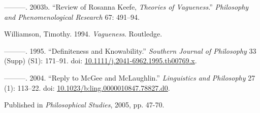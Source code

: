 \documentclass[
  10pt,
  letterpaper,
  DIV=11,
  numbers=noendperiod,
  twoside]{scrartcl}
\newlength{\cslhangindent}
\newenvironment{CSLReferences}[2] %
 {\begin{list}{}{%
  \setlength{\itemindent}{0pt}
  \setlength{\leftmargin}{0pt}
  \setlength{\parsep}{0pt}
  \ifodd #1
   \setlength{\leftmargin}{\cslhangindent}
   \setlength{\itemindent}{-1\cslhangindent}
  \fi
  \setlength{\itemsep}{#2\baselineskip}}}
 {\end{list}}
\begin{document}
\begin{CSLReferences}{1}{0}
---------. 2003b. {``Review of Rosanna Keefe, \emph{Theories of
Vagueness}.''} \emph{Philosophy and Phenomenological Research} 67:
491--94.

Williamson, Timothy. 1994. \emph{{Vagueness}}. Routledge.

---------. 1995. {``Definiteness and Knowability.''} \emph{Southern
Journal of Philosophy} 33 (Supp) (S1): 171--91. doi:
\href{https://doi.org/10.1111/j.2041-6962.1995.tb00769.x}{10.1111/j.2041-6962.1995.tb00769.x}.

---------. 2004. {``{Reply to McGee and McLaughlin}.''}
\emph{Linguistics and Philosophy} 27 (1): 113--22. doi:
\href{https://doi.org/10.1023/b:ling.0000010847.78827.d0}{10.1023/b:ling.0000010847.78827.d0}.

\end{CSLReferences}



\noindent Published in\emph{
Philosophical Studies}, 2005, pp. 47-70.
\end{document}
